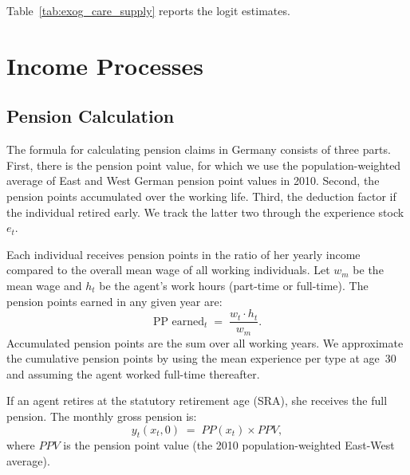 Table~\ref{tab:exog_care_supply} reports the logit estimates.

\begin{table}[htbp]
\centering
\caption{Exogenous Care Supply --- Logit Parameters}
\label{tab:exog_care_supply}

\end{table}


\section{Income Processes}
\label{sec:income_processes}


\subsection{Pension Calculation}
\label{sec:pension}

The formula for calculating pension claims in Germany consists of three
parts.  First, there is the pension point value, for which we use the
population-weighted average of East and West German pension point values in
2010.  Second, the pension points accumulated over the working life.  Third,
the deduction factor if the individual retired early.  We track the latter
two through the experience stock $e_t$.

Each individual receives pension points in the ratio of her yearly income
compared to the overall mean wage of all working individuals.  Let $w_m$ be
the mean wage and $h_t$ be the agent's work hours (part-time or full-time).
The pension points earned in any given year are:
\begin{equation}
  \text{PP earned}_t \;=\; \frac{w_t \cdot h_t}{w_m}.
  \label{eq:pension_points_earned}
\end{equation}
Accumulated pension points are the sum over all working years.  We
approximate the cumulative pension points by using the mean experience per
type at age~30 and assuming the agent worked full-time thereafter.

If an agent retires at the statutory retirement age (SRA), she receives the
full pension.  The monthly gross pension is:
\begin{equation}
  y_t(x_t, 0) \;=\; PP(x_t) \times PPV,
  \label{eq:pension_gross}
\end{equation}
where $PPV$ is the pension point value (the 2010 population-weighted
East-West average).

